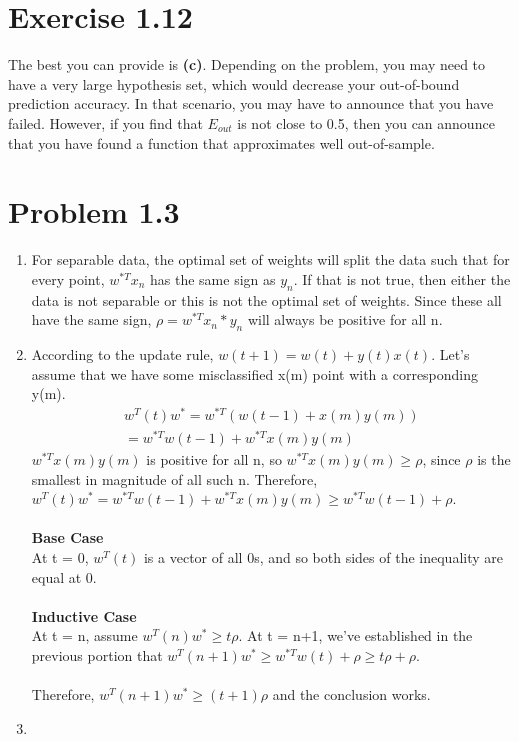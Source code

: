 \documentclass[12pt]{article}
\begin{document}
\section*{Exercise 1.12}
The best you can provide is \textbf{(c)}. Depending on the problem, you may need to have a very large hypothesis set, which would decrease your out-of-bound prediction accuracy. In that scenario, you may have to announce that you have failed. However, if you find that $E_{out}$ is not close to 0.5, then you can announce that you have found a function that approximates well out-of-sample.

\section*{Problem 1.3}
\begin{enumerate}[label=(\alph*)]
	\item For separable data, the optimal set of weights will split the data such that for every point, $w^{*T}x_n$ has the same sign as $y_n$. If that is not true, then either the data is not separable or this is not the optimal set of weights. Since these all have the same sign, $\rho = w^{*T}x_n*y_n$ will always be positive for all n.
	\item According to the update rule, $w(t+1) = w(t) + y(t)x(t)$. Let's assume that we have some misclassified x(m) point with a corresponding y(m).
	\begin{gather*}
		w^T(t)w^* = w^{*T}(w(t-1) + x(m)y(m))
		\\ = w^{*T}w(t-1) + w^{*T}x(m)y(m)
	\end{gather*}
	$w^{*T}x(m)y(m)$ is positive for all n, so $w^{*T}x(m)y(m) \ge \rho$, since $\rho$ is the smallest in magnitude of all such n. Therefore, $w^T(t)w^* = w^{*T}w(t-1) + w^{*T}x(m)y(m) \ge w^{*T}w(t-1) + \rho$.
	\\ \\ \textbf{Base Case}
	\\ At t = 0, $w^T(t)$ is a vector of all 0s, and so both sides of the inequality are equal at 0.
	\\ \\ \textbf{Inductive Case}
	\\ At t = n, assume $w^T(n)w^* \ge t\rho$. At t = n+1, we've established in the previous portion that $w^T(n+1)w^* \ge w^{*T}w(t) + \rho \ge t\rho + \rho$.
	\\ \\ Therefore, $w^T(n+1)w^* \ge (t+1)\rho$ and the conclusion works.
	\item 

\end{enumerate}
\end{document}
